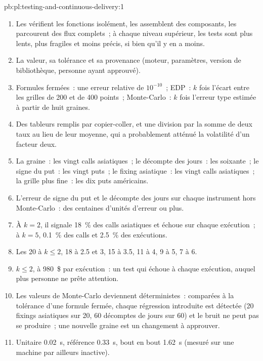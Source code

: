 \begin{solution}{pb:pl:testing-and-continuous-delivery:1}
\begin{enumerate}
\item Les  vérifient les fonctions isolément, les  assemblent des composants, les  parcourent des flux complets~; à chaque niveau supérieur, les tests sont plus
lents, plus fragiles et moins précis, si bien qu'il y en a moins.
\item La valeur, sa tolérance et sa provenance (moteur, paramètres, version de bibliothèque, personne ayant approuvé).
\item Formules fermées~: une erreur relative de $10^{-10}$~; EDP~: $k$ fois l'écart entre les grilles de 200 et de 400 points~; Monte-Carlo~: $k$ fois l'erreur type estimée à partir de
huit graines.
\item Des tableurs remplis par copier-coller, et une division par la somme de deux taux au lieu de leur moyenne, qui a probablement atténué
la volatilité d'un facteur deux.
\item La graine~: les vingt calls asiatiques~; le décompte des jours~: les soixante~; le signe du put~: les vingt puts~; le fixing asiatique~: les vingt calls asiatiques~;
la grille plus fine~: les dix puts américains.
\item L'erreur de signe du put et le décompte des jours sur chaque instrument hors Monte-Carlo~: des centaines d'unités d'erreur ou plus.
\item À $k=2$, il signale 18~\% des calls asiatiques et échoue sur chaque exécution~; à $k=5$, 0.1~\% des calls et 2.5~\% des exécutions.
\item Les 20 à $k\le2$, 18 à 2.5 et 3, 15 à 3.5, 11 à 4, 9 à 5, 7 à 6.
\item $k\le2$, à 980~\$ par exécution~: un test qui échoue à chaque exécution, auquel plus personne ne prête attention.
\item Les valeurs de Monte-Carlo deviennent déterministes~: comparées à la tolérance d'une formule fermée, chaque régression introduite est détectée (20 fixings asiatiques sur 20,
60 décomptes de jours sur 60) et le bruit ne peut pas se produire~; une nouvelle graine est un changement à approuver.
\item Unitaire 0.02~s, référence 0.33~s, bout en bout 1.62~s (mesuré sur une machine par ailleurs inactive).

\end{enumerate}
\end{solution}
